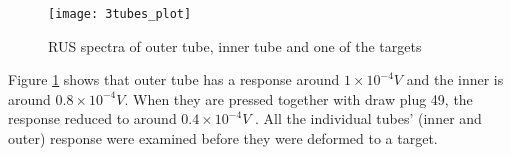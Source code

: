 \begin{doublespacing}

\begin{figure}[H]
\texttt{[image: 3tubes\_plot]}
\caption{RUS spectra of outer tube, inner tube and one of the targets}
\label{fig_3_diff_tubes}
\end{figure}

Figure \ref{fig_3_diff_tubes} shows that outer tube has a response around $1\times 10^{-4} V$ and the inner is around $0.8 \times 10^{-4} V$. When they are pressed together with draw plug 49, the response reduced to around $0.4\times 10^{-4} V$ . All the individual tubes' (inner and outer) response were examined before they were deformed to a target. 



\end{doublespacing}

